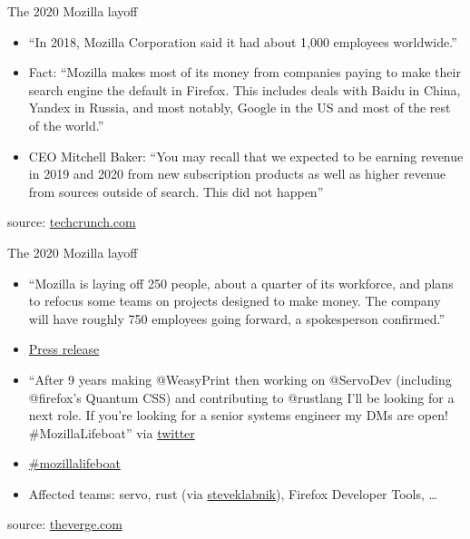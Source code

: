 \documentclass{beamer}
\begin{document}
\begin{frame}[fragile]{The 2020 Mozilla layoff}
  \begin{itemize}
    \item “In 2018, Mozilla Corporation said it had about 1,000 employees worldwide.”
    \item Fact: “Mozilla makes most of its money from companies paying to make their search engine the default in Firefox. This includes deals with Baidu in China, Yandex in Russia, and most notably, Google in the US and most of the rest of the world.”
    \item CEO Mitchell Baker: “You may recall that we expected to be earning revenue in 2019 and 2020 from new subscription products as well as higher revenue from sources outside of search. This did not happen”
  \end{itemize}
  source: \href{https://techcrunch.com/2020/01/15/mozilla-lays-off-70-as-it-waits-for-subscription-products-to-generate-revenue/}{techcrunch.com}
\end{frame}

\begin{frame}[fragile]{The 2020 Mozilla layoff}
  \begin{itemize}
    \item “Mozilla is laying off 250 people, about a quarter of its workforce, and plans to refocus some teams on projects designed to make money. The company will have roughly 750 employees going forward, a spokesperson confirmed.”
    \item \href{https://blog.mozilla.org/blog/2020/08/11/changing-world-changing-mozilla/}{Press release}
    \item “After 9 years making @WeasyPrint then working on @ServoDev (including @firefox's Quantum CSS) and contributing to @rustlang I'll be looking for a next role. If you're looking for a senior systems engineer my DMs are open! #MozillaLifeboat” via \href{https://twitter.com/SimonSapin/status/1295818647135494151}{twitter}
    \item \href{https://mozillalifeboat.com/}{\#mozillalifeboat}
    \item Affected teams: servo, rust (via \href{https://news.ycombinator.com/item?id=24144938}{steveklabnik}), Firefox Developer Tools, …
  \end{itemize}
  source: \href{https://www.theverge.com/2020/8/11/21363424/mozilla-layoffs-quarter-staff-250-people-new-revenue-focus}{theverge.com}
\end{frame}
\end{document}
